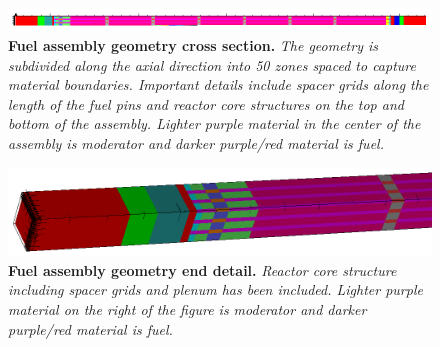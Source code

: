 \documentclass[letterpaper,11pt]{article}
\begin{document}
\begin{figure}[t!]
  \begin{center}
    \includegraphics[width=6.0in]{problem3_axial_mat.png}
  \end{center}
  \caption{\textbf{Fuel assembly geometry cross section.} \textit{The
      geometry is subdivided along the axial direction into 50 zones
      spaced to capture material boundaries. Important details include
      spacer grids along the length of the fuel pins and reactor core
      structures on the top and bottom of the assembly. Lighter purple
      material in the center of the assembly is moderator and darker
      purple/red material is fuel.}}
  \label{fig:problem3_axial_mat}
\end{figure}
\begin{figure}[t!]
  \begin{center}
    \includegraphics[width=6.0in]{problem3_end.png}
  \end{center}
  \caption{\textbf{Fuel assembly geometry end detail.}
    \textit{Reactor core structure including spacer grids and plenum
      has been included. Lighter purple material on the right of the
      figure is moderator and darker purple/red material is fuel.}}
  \label{fig:problem3_end}
\end{figure}
\end{document}
